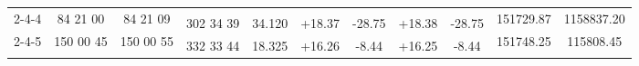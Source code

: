 \documentclass[UTF8]{ctexart}
\begin{document}
\begin{table}[h]
\begin{tabular}{|ccccccccccc|}
		\multicolumn{1}{|c|}{\multirow{2}{*}{2-4-4}}                                             & \multicolumn{1}{c|}{\multirow{2}{*}{84 21 00}}                                              & \multicolumn{1}{c|}{\multirow{2}{*}{84 21 09}}                                              & \multicolumn{1}{c|}{}                                                                       & \multicolumn{1}{c|}{}                                                                    & \multicolumn{1}{c|}{}                        & \multicolumn{1}{c|}{}                        & \multicolumn{1}{c|}{}                        & \multicolumn{1}{c|}{}                        & \multicolumn{1}{c|}{\multirow{2}{*}{151729.87}} & \multirow{2}{*}{1158837.20} \\ \cline{4-9}
		\multicolumn{1}{|c|}{}                                                                   & \multicolumn{1}{c|}{}                                                                       & \multicolumn{1}{c|}{}                                                                       & \multicolumn{1}{c|}{\multirow{2}{*}{302 34 39}}                                             & \multicolumn{1}{c|}{\multirow{2}{*}{34.120}}                                             & \multicolumn{1}{c|}{\multirow{2}{*}{+18.37}} & \multicolumn{1}{c|}{\multirow{2}{*}{-28.75}} & \multicolumn{1}{c|}{\multirow{2}{*}{+18.38}} & \multicolumn{1}{c|}{\multirow{2}{*}{-28.75}} & \multicolumn{1}{c|}{}                           &                             \\ \cline{1-3} \cline{10-11} 
		\multicolumn{1}{|c|}{\multirow{2}{*}{2-4-5}}                                             & \multicolumn{1}{c|}{\multirow{2}{*}{150 00 45}}                                             & \multicolumn{1}{c|}{\multirow{2}{*}{150 00 55}}                                             & \multicolumn{1}{c|}{}                                                                       & \multicolumn{1}{c|}{}                                                                    & \multicolumn{1}{c|}{}                        & \multicolumn{1}{c|}{}                        & \multicolumn{1}{c|}{}                        & \multicolumn{1}{c|}{}                        & \multicolumn{1}{c|}{\multirow{2}{*}{151748.25}} & \multirow{2}{*}{115808.45}  \\ \cline{4-9}
		\multicolumn{1}{|c|}{}                                                                   & \multicolumn{1}{c|}{}                                                                       & \multicolumn{1}{c|}{}                                                                       & \multicolumn{1}{c|}{\multirow{2}{*}{332 33 44}}                                             & \multicolumn{1}{c|}{\multirow{2}{*}{18.325}}                                             & \multicolumn{1}{c|}{\multirow{2}{*}{+16.26}} & \multicolumn{1}{c|}{\multirow{2}{*}{-8.44}}  & \multicolumn{1}{c|}{\multirow{2}{*}{+16.25}} & \multicolumn{1}{c|}{\multirow{2}{*}{-8.44}}  & \multicolumn{1}{c|}{}                           &                             \\ \cline{1-3} \cline{10-11} 

\end{tabular}
\end{table}
\end{document}
